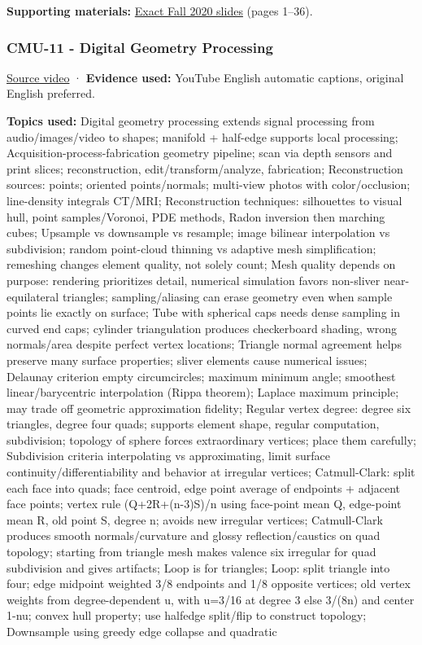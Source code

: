 \textbf{Supporting materials:} \href{https://15462.courses.cs.cmu.edu/fall2020content/lectures/10_meshes/10_meshes_slides.pdf}{Exact Fall 2020 slides} (pages 1--36).

\subsubsection{CMU-11 - Digital Geometry Processing}\label{04-visual-computing-ii-ch036-cmu-11---digital-geometry-processing}

\href{https://www.youtube.com/watch?v=BwpEoZYcrwY}{Source video} · \textbf{Evidence used:} YouTube English automatic captions, original English preferred.

\textbf{Topics used:} Digital geometry processing extends signal processing from audio/images/video to shapes; manifold + half-edge supports local processing; Acquisition-process-fabrication geometry pipeline; scan via depth sensors and print slices; reconstruction, edit/transform/analyze, fabrication; Reconstruction sources: points; oriented points/normals; multi-view photos with color/occlusion; line-density integrals CT/MRI; Reconstruction techniques: silhouettes to visual hull, point samples/Voronoi, PDE methods, Radon inversion then marching cubes; Upsample vs downsample vs resample; image bilinear interpolation vs subdivision; random point-cloud thinning vs adaptive mesh simplification; remeshing changes element quality, not solely count; Mesh quality depends on purpose: rendering prioritizes detail, numerical simulation favors non-sliver near-equilateral triangles; sampling/aliasing can erase geometry even when sample points lie exactly on surface; Tube with spherical caps needs dense sampling in curved end caps; cylinder triangulation produces checkerboard shading, wrong normals/area despite perfect vertex locations; Triangle normal agreement helps preserve many surface properties; sliver elements cause numerical issues; Delaunay criterion empty circumcircles; maximum minimum angle; smoothest linear/barycentric interpolation (Rippa theorem); Laplace maximum principle; may trade off geometric approximation fidelity; Regular vertex degree: degree six triangles, degree four quads; supports element shape, regular computation, subdivision; topology of sphere forces extraordinary vertices; place them carefully; Subdivision criteria interpolating vs approximating, limit surface continuity/differentiability and behavior at irregular vertices; Catmull-Clark: split each face into quads; face centroid, edge point average of endpoints + adjacent face points; vertex rule (Q+2R+(n-3)S)/n using face-point mean Q, edge-point mean R, old point S, degree n; avoids new irregular vertices; Catmull-Clark produces smooth normals/curvature and glossy reflection/caustics on quad topology; starting from triangle mesh makes valence six irregular for quad subdivision and gives artifacts; Loop is for triangles; Loop: split triangle into four; edge midpoint weighted 3/8 endpoints and 1/8 opposite vertices; old vertex weights from degree-dependent u, with u=3/16 at degree 3 else 3/(8n) and center 1-nu; convex hull property; use halfedge split/flip to construct topology; Downsample using greedy edge collapse and quadratic 
